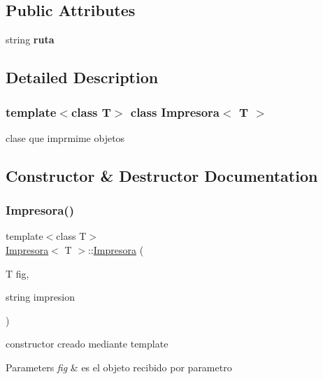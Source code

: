 \subsection*{Public Attributes}
\begin{DoxyCompactItemize}
\item 
\mbox{\label{class_impresora_a65df8a4e9e23fe2ff39c0b786e833b34}} 
string {\bfseries ruta}
\end{DoxyCompactItemize}


\subsection{Detailed Description}
\subsubsection*{template$<$class T$>$\newline
class Impresora$<$ T $>$}

clase que imprmime objetos 

\subsection{Constructor \& Destructor Documentation}
\mbox{\label{class_impresora_a82093c181cb0601fc82dbbeff7247763}} 
\subsubsection{\texorpdfstring{Impresora()}{Impresora()}}
{\footnotesize\ttfamily template$<$class T$>$ \\
\hyperlink{class_impresora}{Impresora}$<$ T $>$\+::\hyperlink{class_impresora}{Impresora} (\begin{DoxyParamCaption}\item[{T}]{fig,  }\item[{string}]{impresion }\end{DoxyParamCaption})\hspace{0.3cm}{\ttfamily [inline]}}



constructor creado mediante template 


\begin{DoxyParams}{Parameters}
{\em fig} & es el objeto recibido por parametro \\
\hline
\end{DoxyParams}


